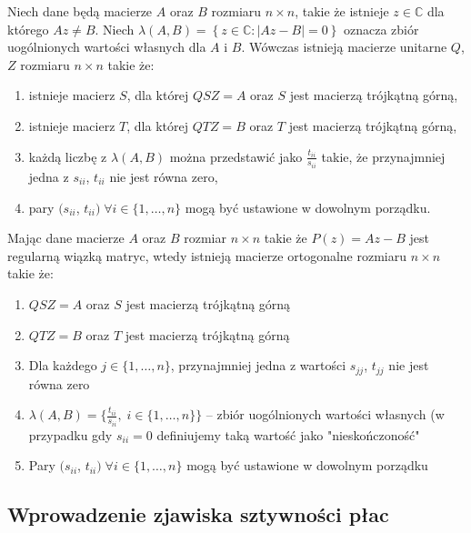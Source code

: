 \begin{theorem}
\label{theorem:schur}

Niech dane będą macierze $A$ oraz $B$ rozmiaru $n \times n$, takie że istnieje $z \in \mathbb{C}$ dla którego $A z \neq B$. Niech $\lambda(A, B) = \left\{z \in \mathbb{C}\colon |A z - B| = 0\right\}$ oznacza zbiór uogólnionych wartości własnych dla $A$ i $B$. Wówczas istnieją macierze unitarne $Q$, $Z$ rozmiaru $n \times n$ takie że:
\begin{enumerate}
    \item istnieje macierz $S$, dla której $QSZ = A$ oraz $S$ jest macierzą trójkątną górną,
    \item istnieje macierz $T$, dla której $QTZ = B$ oraz $T$ jest macierzą trójkątną górną,
    \item każdą liczbę z $\lambda(A, B)$ można przedstawić jako $\frac{t_{ii}}{s_{ii}}$ takie, że przynajmniej jedna z $s_{ii}$, $t_{ii}$ nie jest równa zero,
    \item pary $(s_{ii}$, $t_{ii})\;\forall i \in \{1,\dots, n\}$ mogą być ustawione w dowolnym porządku.
\end{enumerate}

Mając dane macierze $A$ oraz $B$ rozmiar $n \times n$ takie że $P(z) = Az - B$ jest regularną wiązką matryc, wtedy istnieją macierze ortogonalne rozmiaru $n \times n$ takie że:
\begin{enumerate}
    \item $QSZ = A$ oraz $S$ jest macierzą trójkątną górną
    \item $QTZ = B$ oraz $T$ jest macierzą trójkątną górną
    \item Dla każdego $j \in \{1,\dots, n\}$, przynajmniej jedna z wartości $s_{jj}$, $t_{jj}$ nie jest równa zero
    \item $\lambda(A,B) = \{ \frac{t_{ii}}{s_{ii}},\; i \in \{1,\dots, n\} \}$ -- zbiór uogólnionych wartości własnych (w przypadku gdy $s_{ii} = 0$ definiujemy taką wartość jako "nieskończoność"
    \item Pary $(s_{ii}$, $t_{ii})\;\forall i \in \{1,\dots, n\}$ mogą być ustawione w dowolnym porządku
\end{enumerate}
\end{theorem}


\subsection{Wprowadzenie zjawiska sztywności płac}

